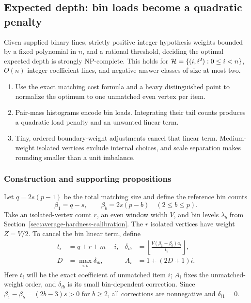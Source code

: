 \subsection{Expected depth: bin loads become a quadratic penalty}

\begin{theorem}
\label{thm:strong-average}
Given supplied binary lines, strictly positive integer hypothesis
weights bounded by a fixed polynomial in $n$, and a rational threshold,
deciding the optimal expected depth is strongly NP-complete.
This holds for $\mathcal H=\{(i,i^2):0\le i<n\}$, $O(n)$ integer-coefficient
lines, and negative answer classes of size at most two.
\end{theorem}

\begin{proofstrategy}
\begin{enumerate}
\item Use the exact matching cost formula and a heavy distinguished point
to normalize the optimum to one unmatched even vertex per item.
\item Pair-mass histograms encode bin loads. Integrating their tail
counts produces a quadratic load penalty and an unwanted linear term.
\item Tiny, ordered boundary-weight adjustments cancel that linear
term. Medium-weight isolated vertices exclude internal choices, and
scale separation makes rounding smaller than a unit imbalance.
\end{enumerate}
\end{proofstrategy}

\subsubsection{Construction and supporting propositions}

Let $q=2s(p-1)$ be the total matching size and define the reference
bin counts
\[
 \beta_1=q-s,\qquad \beta_b=2s(p-b)\quad(2\le b\le p).
\]
Take an isolated-vertex count $r$, an even window width $V$, and bin
levels $\lambda_b$ from Section~\ref{sec:average-hardness-calibration}.
The $r$ isolated vertices have weight $Z=V/2$. To cancel the bin
linear term, define
\[
 \begin{aligned}
 t_i&=q+r+m-i,&
 \delta_{ib}&=\left\lfloor\frac{V(\beta_1-\beta_b)a_i}{t_i}\right\rfloor,\\
 D&=\max_{i,b}\delta_{ib},& A_i&=1+(2D+1)i.
 \end{aligned}
\]
Here $t_i$ will be the exact coefficient of unmatched item $i$;
$A_i$ fixes the unmatched-weight order, and $\delta_{ib}$ is its small
bin-dependent correction. Since
$\beta_1-\beta_b=(2b-3)s>0$ for $b\ge2$, all corrections are
nonnegative and $\delta_{i1}=0$.

